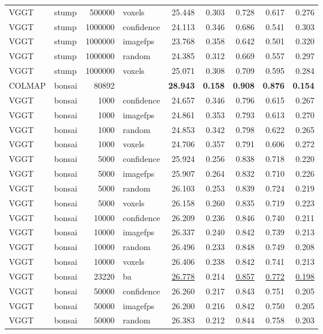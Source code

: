 \begin{table}[H]
\begin{tabular}{llrlrrrrr}
VGGT & stump & 500000 & voxels & 25.448 & 0.303 & 0.728 & 0.617 & 0.276 \\
VGGT & stump & 1000000 & confidence & 24.113 & 0.346 & 0.686 & 0.541 & 0.303 \\
VGGT & stump & 1000000 & imagefps & 23.768 & 0.358 & 0.642 & 0.501 & 0.320 \\
VGGT & stump & 1000000 & random & 24.385 & 0.312 & 0.669 & 0.557 & 0.297 \\
VGGT & stump & 1000000 & voxels & 25.071 & 0.308 & 0.709 & 0.595 & 0.284 \\
\midrule
COLMAP & bonsai & 80892 &  & \textbf{28.943} & \textbf{0.158} & \textbf{0.908} & \textbf{0.876} & \textbf{0.154} \\
VGGT & bonsai & 1000 & confidence & 24.657 & 0.346 & 0.796 & 0.615 & 0.267 \\
VGGT & bonsai & 1000 & imagefps & 24.861 & 0.353 & 0.793 & 0.613 & 0.270 \\
VGGT & bonsai & 1000 & random & 24.853 & 0.342 & 0.798 & 0.622 & 0.265 \\
VGGT & bonsai & 1000 & voxels & 24.706 & 0.357 & 0.791 & 0.606 & 0.272 \\
VGGT & bonsai & 5000 & confidence & 25.924 & 0.256 & 0.838 & 0.718 & 0.220 \\
VGGT & bonsai & 5000 & imagefps & 25.907 & 0.264 & 0.832 & 0.710 & 0.226 \\
VGGT & bonsai & 5000 & random & 26.103 & 0.253 & 0.839 & 0.724 & 0.219 \\
VGGT & bonsai & 5000 & voxels & 26.158 & 0.260 & 0.835 & 0.719 & 0.223 \\
VGGT & bonsai & 10000 & confidence & 26.209 & 0.236 & 0.846 & 0.740 & 0.211 \\
VGGT & bonsai & 10000 & imagefps & 26.337 & 0.240 & 0.842 & 0.739 & 0.213 \\
VGGT & bonsai & 10000 & random & 26.496 & 0.233 & 0.848 & 0.749 & 0.208 \\
VGGT & bonsai & 10000 & voxels & 26.406 & 0.238 & 0.842 & 0.741 & 0.213 \\
VGGT & bonsai & 23220 & ba & \underline{26.778} & 0.214 & \underline{0.857} & \underline{0.772} & \underline{0.198} \\
VGGT & bonsai & 50000 & confidence & 26.260 & 0.217 & 0.843 & 0.751 & 0.205 \\
VGGT & bonsai & 50000 & imagefps & 26.200 & 0.216 & 0.842 & 0.750 & 0.205 \\
VGGT & bonsai & 50000 & random & 26.383 & 0.212 & 0.844 & 0.758 & 0.203 \\

\end{tabular}
\end{table}
